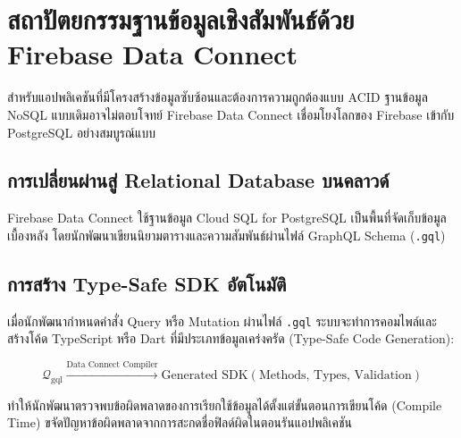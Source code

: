 \chapter{สถาปัตยกรรมฐานข้อมูลเชิงสัมพันธ์ด้วย Firebase Data Connect}

สำหรับแอปพลิเคชันที่มีโครงสร้างข้อมูลซับซ้อนและต้องการความถูกต้องแบบ ACID ฐานข้อมูล NoSQL แบบเดิมอาจไม่ตอบโจทย์ Firebase Data Connect เชื่อมโยงโลกของ Firebase เข้ากับ PostgreSQL อย่างสมบูรณ์แบบ

\section{การเปลี่ยนผ่านสู่ Relational Database บนคลาวด์}

Firebase Data Connect ใช้ฐานข้อมูล Cloud SQL for PostgreSQL เป็นพื้นที่จัดเก็บข้อมูลเบื้องหลัง โดยนักพัฒนาเขียนนิยามตารางและความสัมพันธ์ผ่านไฟล์ GraphQL Schema (\texttt{.gql})

\section{การสร้าง Type-Safe SDK อัตโนมัติ}

เมื่อนักพัฒนากำหนดคำสั่ง Query หรือ Mutation ผ่านไฟล์ \texttt{.gql} ระบบจะทำการคอมไพล์และสร้างโค้ด TypeScript หรือ Dart ที่มีประเภทข้อมูลเคร่งครัด (Type-Safe Code Generation):

\begin{equation}
\mathcal{Q}_{\text{gql}} \xrightarrow{\text{Data Connect Compiler}} \text{Generated SDK} (\text{Methods, Types, Validation})
\end{equation}

ทำให้นักพัฒนาตรวจพบข้อผิดพลาดของการเรียกใช้ข้อมูลได้ตั้งแต่ขั้นตอนการเขียนโค้ด (Compile Time) ขจัดปัญหาข้อผิดพลาดจากการสะกดชื่อฟิลด์ผิดในตอนรันแอปพลิเคชัน
